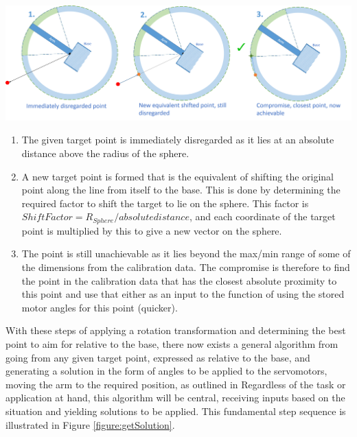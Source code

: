 \documentclass[11pt]{article}
\begin{document}
\begin{center}
\includegraphics[width=\textwidth]{images/gestureSolution2.png}
\label{figure:gestureSolution}
\end{center}


\begin{enumerate}
\item{The given target point is immediately disregarded as it lies at an absolute distance above the radius of the sphere.}
\item{A new target point is formed that is the equivalent of shifting the original point along the line from itself to the base. This is done by determining the required factor to shift the target to lie on the sphere. This factor is $Shift Factor = R_{Sphere} / absolute distance$, and each coordinate of the target point is multiplied by this to give a new vector on the sphere.}
\item{The point is still unachievable as it lies beyond the max/min range of some of the dimensions from the calibration data. The compromise is therefore to find the point in the calibration data that has the closest absolute proximity to this point and use that either as an input to the function of using the stored motor angles for this point (quicker). }
\end{enumerate}



With these steps of applying a rotation transformation and determining the best point to aim for relative to the base, there now exists a general algorithm from going from any given target point, expressed as relative to the base, and generating a solution in the form of angles to be applied to the servomotors, moving the arm to the required position, as outlined in  Regardless of the task or application at hand, this algorithm will be central, receiving inputs based on the situation and yielding solutions to be applied. This fundamental step sequence is illustrated in Figure \ref{figure:getSolution}.
\end{document}
